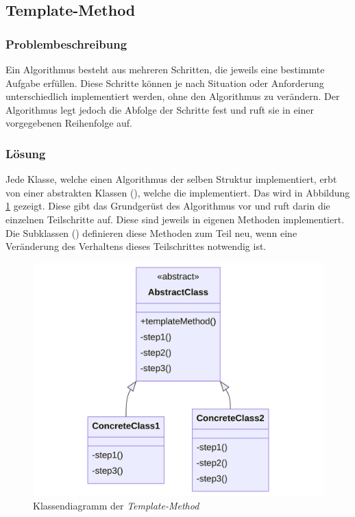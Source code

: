 \subsection{Template-Method}

\subsubsection*{Problembeschreibung}

Ein Algorithmus besteht aus mehreren Schritten, die jeweils eine bestimmte Aufgabe erfüllen. Diese Schritte können je nach Situation oder Anforderung unterschiedlich implementiert werden, ohne den Algorithmus zu verändern. Der Algorithmus legt jedoch die Abfolge der Schritte fest und ruft sie in einer vorgegebenen Reihenfolge auf. \cite{gamma_design_1995}

\subsubsection*{Lösung}

Jede Klasse, welche einen Algorithmus der selben Struktur implementiert, erbt von einer abstrakten Klassen (), welche die  implementiert. Das wird in Abbildung \ref{fig:template-method-class} gezeigt. Diese gibt das Grundgerüst des Algorithmus vor und ruft darin die einzelnen Teilschritte auf. Diese sind jeweils in eigenen Methoden implementiert. Die Subklassen () definieren diese Methoden zum Teil neu, wenn eine Veränderung des Verhaltens dieses Teilschrittes notwendig ist.

\begin{figure}[H]
	\centering
	\includegraphics[width=0.75\linewidth]{images/patterns/template-method-class.png}
	\caption{Klassendiagramm der \emph{Template-Method} \cite{skobeleva_template_2023}}
	\label{fig:template-method-class}
\end{figure}


